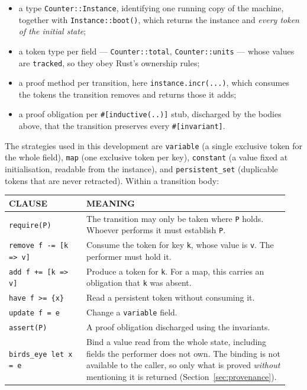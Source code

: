 \documentclass[11pt]{article}
\newcommand{\code}[1]{\texttt{#1}}
\begin{document}
\begin{itemize}[leftmargin=1.2em,itemsep=3pt,topsep=3pt]
\item a type \code{Counter::Instance}, identifying one running copy of the
  machine, together with \code{Instance::boot()}, which returns the instance and
  \emph{every token of the initial state};
\item a token type per field --- \code{Counter::total}, \code{Counter::units}
  --- whose values are \code{tracked}, so they obey Rust's ownership rules;
\item a proof method per transition, here \code{instance.incr(...)}, which
  consumes the tokens the transition removes and returns those it adds;
\item a proof obligation per \code{\#[inductive(..)]} stub, discharged by the
  bodies above, that the transition preserves every \code{\#[invariant]}.
\end{itemize}

The strategies used in this development are \code{variable} (a single exclusive
token for the whole field), \code{map} (one exclusive token per key),
\code{constant} (a value fixed at initialisation, readable from the instance),
and \code{persistent\_set} (duplicable tokens that are never retracted). Within
a transition body:

\begin{center}\small
\begin{tabular}{@{}p{0.26\linewidth}p{0.68\linewidth}@{}}
\toprule
\textbf{\sffamily\scriptsize\MakeUppercase{Clause}} &
\textbf{\sffamily\scriptsize\MakeUppercase{Meaning}} \\
\midrule
\code{require(P)} & The transition may only be taken where \code{P} holds.
  Whoever performs it must establish \code{P}. \\
\addlinespace
\code{remove f -= [k => v]} & Consume the token for key \code{k}, whose value is
  \code{v}. The performer must hold it. \\
\addlinespace
\code{add f += [k => v]} & Produce a token for \code{k}. For a map, this
  carries an obligation that \code{k} was absent. \\
\addlinespace
\code{have f >= \{x\}} & Read a persistent token without consuming it. \\
\addlinespace
\code{update f = e} & Change a \code{variable} field. \\
\addlinespace
\code{assert(P)} & A proof obligation discharged using the invariants. \\
\addlinespace
\code{birds\_eye let x = e} & Bind a value read from the whole state, including
  fields the performer does not own. The binding is not available to the caller,
  so only what is proved \emph{without} mentioning it is returned
  (Section~\ref{sec:provenance}). \\
\bottomrule
\end{tabular}
\end{center}
\end{document}
